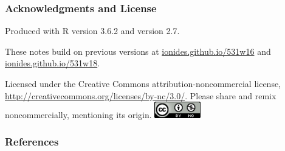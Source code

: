 \documentclass{beamer}\usepackage[]{graphicx}\usepackage[]{color}
\begin{document}
\begin{frame}[fragile]
\frametitle{Acknowledgments and License}

\bi
\item Produced with R version 3.6.2 and  version 2.7.

\item These notes build on previous versions at \url{ionides.github.io/531w16} and \url{ionides.github.io/531w18}. 
\item
Licensed under the Creative Commons attribution-noncommercial license, \url{http://creativecommons.org/licenses/by-nc/3.0/}.
Please share and remix noncommercially, mentioning its origin.  
\includegraphics[width=2cm]{cc-by-nc.png}
\ei

\end{frame}


\begin{frame}[allowframebreaks]
\frametitle{References}

\end{frame}
\end{document}
